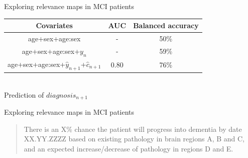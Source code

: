 \documentclass[t]{beamer}
\begin{document}
	\begin{frame}{Exploring relevance maps in MCI patients}
		\centering
		\vfill
		\begin{tabular}{|c|c|c|}
			\hline
			\textbf{Covariates}&\textbf{AUC}&\textbf{Balanced accuracy}\\
			\hline
			age+sex+age:sex&-&50\%\\
			\hline
			age+sex+age:sex+$y_{n}$&-&59\%\\
			\hline
			age+sex+age:sex+$\hat{y}_{n+1}$+$\hat{c}_{n+1}$&0.80&76\%\\
			\hline
		\end{tabular}\\
		\vspace{0.4cm}
		Prediction of $diagnosis_{n+1}$
		\vfill
	\end{frame}

	\begin{frame}{Exploring relevance maps in MCI patients}
		\centering
		\vfill
		\noindent
		\begin{quotation}
			There is an X\% chance the patient will progress into dementia by date XX.YY.ZZZZ based on existing pathology in brain regions A, B and C, and an expected increase/decrease of pathology in regions D and E.
		\end{quotation}
		\vfill
	\end{frame}
\end{document}
